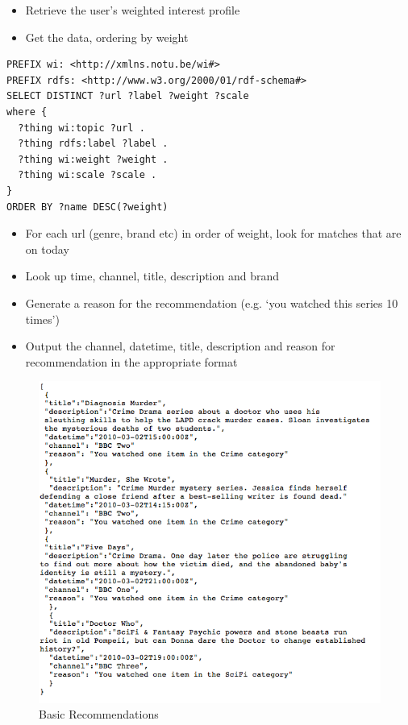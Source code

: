 \documentclass[]{article}
\begin{document}
\begin{itemize}
\item{Retrieve the user's weighted interest profile}
\item{Get the data, ordering by weight}
\end{itemize}

\begin{verbatim}
PREFIX wi: <http://xmlns.notu.be/wi#>
PREFIX rdfs: <http://www.w3.org/2000/01/rdf-schema#>
SELECT DISTINCT ?url ?label ?weight ?scale
where {
  ?thing wi:topic ?url .
  ?thing rdfs:label ?label .
  ?thing wi:weight ?weight .
  ?thing wi:scale ?scale .
}
ORDER BY ?name DESC(?weight)
\end{verbatim}

\begin{itemize}
\item{For each url (genre, brand etc) in order of weight, look for matches that are on today}
\item{Look up time, channel, title, description and brand}
\item{Generate a reason for the recommendation (e.g. `you watched this series 10 times')}
\item{Output the channel, datetime, title, description and reason for recommendation in the appropriate format}
\end{itemize}

\begin{figure}[h] 
\begin{center}
\includegraphics[width=12 cm]{basicrecommendations.png}
\caption{Basic Recommendations}
\label{basicrecomendations}
\end{center}
\end{figure}
\end{document}
